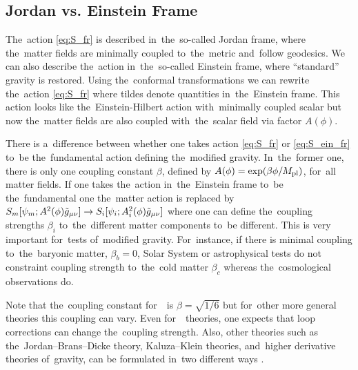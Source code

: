 \subsection{Jordan vs. Einstein Frame}
The~action \eqref{eq:S_fr} is described in~the~so-called Jordan frame, where the~matter fields are minimally coupled to~the~metric and~follow geodesics. We can also describe the~action in~the~so-called Einstein frame, where ``standard'' gravity is restored. Using the~conformal transformations
we can rewrite the~action \eqref{eq:S_fr}
where tildes denote quantities in~the~Einstein frame. This action looks like the~Einstein-Hilbert action with~minimally coupled scalar but now the~matter fields are also coupled with~the~scalar field via factor $A(\phi)$. 

There is a~difference between whether one takes action \eqref{eq:S_fr} or \eqref{eq:S_ein_fr} to~be the~fundamental action defining the~modified gravity. In~the~former one, there is only one coupling constant $\beta$, defined by $A(\phi)=\exp(\beta\phi/M_{\text{\scriptsize pl}})$, for~all matter fields. If one takes the~action in~the~Einstein frame to~be the~fundamental one the~matter action is replaced by $S_m[\psi_m;A^2(\phi)\tilde{g}_{\mu\nu}]\rightarrow S_i[\psi_i;A_i^2(\phi)\tilde{g}_{\mu\nu}]$ where one can define the~coupling strengths $\beta_i$ to~the~different matter components to~be different. This is very important for~tests of~modified gravity. For~instance, if there is minimal coupling to~the~baryonic matter, $\beta_b=0$, Solar System or astrophysical tests do not constraint coupling strength to~the~cold matter $\beta_c$ whereas the~cosmological observations do.

Note that the~coupling constant for~\fR\ is $\beta=\sqrt{1/6}$ but for~other more general theories this coupling can vary. Even for~\fR\ theories, one expects that loop corrections can change the~coupling strength. Also, other theories such as the~Jordan--Brans--Dicke theory, Kaluza--Klein theories, and~higher derivative theories of~gravity, can be formulated in~two different ways \parencite{Faraoni:1998qx}.

